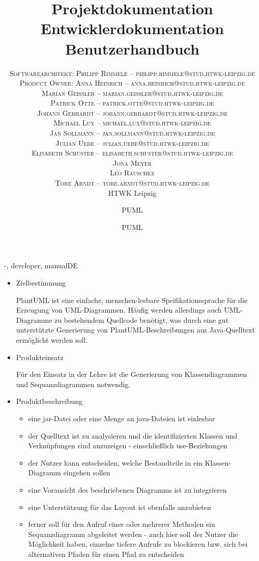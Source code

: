 \documentclass[twoside]{report}
\title{\vspace{-5mm}%
	\fontsize{24pt}{10pt}\selectfont
	\textbf{Projektdokumentation}
	}
\author{%
	\large
	\textsc{Softwarearchitekt: Philipp Rimmele -- philipp.rimmele@stud.htwk-leipzig.de} \\[2mm]
	\textsc{Product Owner: Anna Heinrich -- anna.heinrich@stud.htwk-leipzig.de} \\[2mm]
	\textsc{Marian Geißler -- marian.geissler@stud.htwk-leipzig.de} \\[2mm]
	\textsc{Patrick Otte -- patrick.otte@stud.htwk-leipzig.de} \\[2mm]
	\textsc{Johann Gerhardt -- johann.gerhardt@stud.htwk-leipzig.de} \\[2mm]
	\textsc{Michael Lux -- michael.lux@stud.htwk-leipzig.de}	\\[2mm]	
	\textsc{Jan Sollmann -- jan.sollmann@stud.htwk-leipzig.de} \\[2mm]
	\textsc{Julian Uebe -- julian.uebe@stud.htwk-leipzig.de} \\[2mm]
	\textsc{Elisabeth Schuster -- elisabeth.schuster@stud.htwk-leipzig.de} \\[2mm]		
	\textsc{Jona Meyer}	\\[2mm]	
	\textsc{Leo Rauschke}	\\[2mm]
	\textsc{Tore Arndt -- tore.arndt@stud.htwk-leipzig.de} \\[2mm]
	\normalsize	HTWK Leipzig 
	}
\date{}
\title{\vspace{-5mm}%
	\fontsize{24pt}{10pt}\selectfont
	\textbf{Entwicklerdokumentation}
	}
\author{%
	\large
	\textsc{PUML} \\[2mm]
	}
\date{}
\title{\vspace{-5mm}%
	\fontsize{24pt}{10pt}\selectfont
	\textbf{Benutzerhandbuch}
	}
\author{%
	\large
	\textsc{PUML} \\[2mm]
	}
\date{}
\begin{document}

\maketitle
\thispagestyle{fancy}
\setcounter{tocdepth}{3}
\tableofcontents
\newpage


\begin{shownto}{-, developer, manualDE}


\begin{itemize}
\item Zielbestimmung

PlantUML ist eine einfache, menschen-lesbare Speifikationssprache für die Erzeugung von UML-Diagrammen. Häufig werden allerdings auch UML-Diagramme zu bestehendem Quellcode benötigt, was durch eine gut unterstützte Generierung von PlantUML-Beschreibungen aus Java-Quelltext ermöglicht werden soll.

\item Produkteinsatz
 
Für den Einsatz in der Lehre ist die Generierung von Klassendiagrammen und Sequanzdiagrammen notwendig.

\item Produktbeschreibung
\begin{itemize}
\item eine jar-Datei oder eine Menge an java-Dateien ist einlesbar
\item der Quelltext ist zu analysieren und die identifizierten Klassen und Verknüpfungen sind anzuzeigen - einschließlich use-Beziehungen
\item der Nutzer kann entscheiden, welche Bestandteile in ein Klassen-Diagramm eingehen sollen
\item eine Voransicht des beschriebenen Diagramms ist zu integrieren 
\item eine Unterstützung für das Layout ist ebenfalls anzubieten
\item ferner soll für den Aufruf einer oder mehrerer Methoden ein Sequanzdiagramm abgeleitet werden - auch hier soll der Nutzer die Möglichkeit haben, einzelne tiefere Aufrufe zu blockieren bzw. sich bei alternativen Pfaden für einen Pfad zu entscheiden
\end{itemize}
\end{itemize}
\nsecend


\end{shownto}
\end{document}
